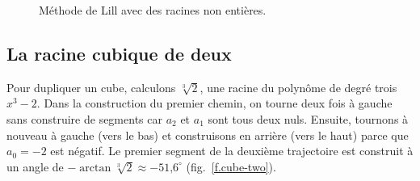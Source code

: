 \begin{figure}[htbp]
\caption{Méthode de Lill avec des racines non entières.}\label{f.noninteger}
\end{figure}



\subsection{La racine cubique de deux}\label{s.cube}

Pour dupliquer un cube, calculons $\sqrt[3]{2}$, une racine du polynôme de degré trois $x^3-2$. Dans la construction du premier chemin, on tourne deux fois à gauche sans construire de segments  car $a_2$ et $a_1$ sont tous deux nuls. Ensuite, tournons à nouveau à gauche (vers le bas) et construisons en arrière (vers le haut) parce que $a_0=-2$ est négatif. Le premier segment de la deuxième trajectoire est construit à un angle de $-\arctan \sqrt[3]{2}\approx -\mbox{51,6}^\circ$ (fig.~\ref{f.cube-two}).

